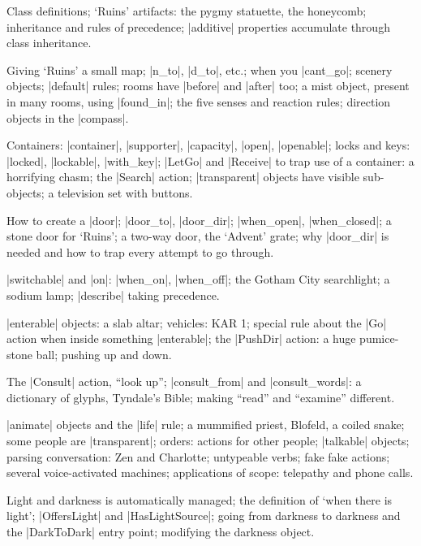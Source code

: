 %
Class definitions; `Ruins' artifacts: the pygmy statuette, the honeycomb;
inheritance and rules of precedence; |additive| properties accumulate
through class inheritance.


%
Giving `Ruins' a small map; |n_to|, |d_to|, etc.; when you |cant_go|;
scenery objects; |default| rules; rooms have |before| and |after| too; a
mist object, present in many rooms, using |found_in|; the five senses
and reaction rules; direction objects in the |compass|.

%
Containers: |container|, |supporter|, |capacity|, |open|, |openable|; locks
and keys: |locked|, |lockable|, |with_key|; |LetGo| and |Receive| to trap
use of a container: a horrifying chasm; the |Search| action; |transparent|
objects have visible sub-objects; a television set with buttons.

%
How to create a |door|; |door_to|, |door_dir|; |when_open|, |when_closed|;
a stone door for `Ruins'; a two-way door, the `Advent' grate; why
|door_dir| is needed and how to trap every attempt to go through.

%
|switchable| and |on|: |when_on|, |when_off|; the Gotham City searchlight;
a sodium lamp; |describe| taking precedence.

%
|enterable| objects: a slab altar; vehicles: KAR 1; special rule about
the |Go| action when inside something |enterable|; the |PushDir| action:
a huge pumice-stone ball; pushing up and down.

%
The |Consult| action, ``look up''; |consult_from| and |consult_words|:
a dictionary of glyphs, Tyndale's Bible; making ``read'' and ``examine''
different.

%
|animate| objects and the |life| rule; a mummified priest, Blofeld,
a coiled snake; some people are |transparent|; orders: actions for other
people; |talkable| objects; parsing conversation: Zen and Charlotte;
untypeable verbs; fake fake actions; several voice-activated machines;
applications of scope: telepathy and phone calls.

%
Light and darkness is automatically managed; the definition of `when there
is light'; |OffersLight| and |HasLightSource|; going from darkness to
darkness and the |DarkToDark| entry point; modifying the darkness object.

